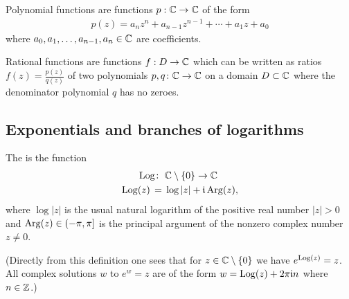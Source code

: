 \begin{definition}[Polynomial]
  \label{def:polynomial}
  Polynomial functions are functions $p : \mathbb{C} \to \mathbb{C}$ of the form
  \begin{align*}
    p(z) = a_n z^n + a_{n-1} z^{n-1} + \cdots + a_1 z + a_0
  \end{align*}
  where $a_0,a_1,\ldots,a_{n-1},a_n \in \mathbb{C}$ are coefficients.
\end{definition}

\begin{definition}
  \label{def:rational_function}
  Rational functions are functions $f : D \to \mathbb{C}$ which can be written as
  ratios $f(z) = \frac{p(z)}{q(z)}$ of two polynomials
  $p, q \colon \mathbb{C} \to \mathbb{C}$ on a domain $D \subset \mathbb{C}$
  where the denominator polynomial $q$ has no zeroes.
\end{definition}



\subsection{Exponentials and branches of logarithms}

\begin{definition}
  \label{def:principal_complex_log}
  The  is the function
  \begin{align*}
    \mathrm{Log} \colon \; & \mathbb{C} \setminus \left\{ 0 \right\} \to \mathbb{C} \\
    \mathrm{Log}(z) \, = \; & \log |z| + \mathfrak{i} \, \mathrm{Arg}(z) ,
  \end{align*}
  where $\log |z|$ is the usual natural logarithm of the positive
  real number $|z|>0$ and
  $\mathrm{Arg}(z) \in (-\pi,\pi]$ is the principal argument of
  the nonzero complex number $z \ne 0$.

  (Directly from this definition one sees that for
  $z \in \mathbb{C} \setminus \left\{ 0 \right\}$ we have $e^{\mathrm{Log}(z)} = z$.
  All complex solutions $w$ to $e^w = z$ are of the
  form $w = \mathrm{Log}(z) + 2 \pi \mathfrak{i} n$ where $n \in \mathbb{Z}$.)
\end{definition}

